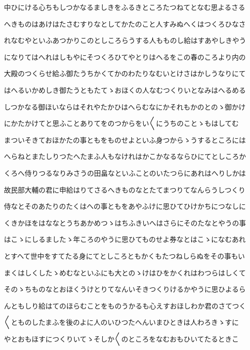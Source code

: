 \documentclass[a4paper,11pt,landscape]{ltjtarticle}
\begin{document}
\par\medskip
中ひにける心ちもしつかなるましきをふるきところたつねてとなむ思よるさる
\par\medskip
へきものはあけはたさむすりなとしてかたのこと人すみぬへくはつくろひなさ
\par\medskip
れなむやといふあつかりこのとしころらうする人もものし給はすあやしきやう
\par\medskip
になりてはへれはしもやにそつくろひてやとりはへるをこの春のころより内の
\par\medskip
大殿のつくらせ給ふ御たうちかくてかのわたりなむいとけさはかしうなりにて
\par\medskip
はへるいかめしき御たうともたてゝおほくの人なむつくりいとなみはへるめる
\par\medskip
しつかなる御ほいならはそれやたかひはへらむなにかそれもかのとのゝ御かけ
\par\medskip
にかたかけてと思ふことありてをのつからをい〱にうちのことゝもはしてむ
\par\medskip
まついそきておほかたの事ともをものせよといふ身つからゝうするところには
\par\medskip
へらねとまたしりつたへたまふ人もなけれはかこかなるならひにてとしころか
\par\medskip
くろへ侍りつるなりみさうの田畠なといふことのいたつらにあれはへりしかは
\par\medskip
故民部大輔の君に申給はりてさるへきものなとたてまつりてなんらうしつくり
\par\medskip
侍なとそのあたりのたくはへの事ともをあやふけに思ひてひけかちにつなしに
\par\medskip
くきかほをはななとうちあかめつゝはちふきいへはさらにそのたなとやうの事
\par\medskip
はこゝにしるましたゝ年ころのやうに思ひてものせよ券なとはこゝになむあれ
\par\medskip
とすへて世中をすてたる身にてとしころともかくもたつねしらぬをその事もい
\par\medskip
まくはしくしたゝめむなといふにも大とのゝけはひをかくれはわつらはしくて
\par\medskip
そのゝちものなとおほくうけとりてなんいそきつくりけるかやうに思ひよるら
\par\medskip
んともしり給はてのほらむことをものうかるも心えすおほしわか君のさてつく
\par\medskip
〱とものしたまふを後のよに人のいひつたへんいまひときは人わろきゝすに
\par\medskip
やとおもほすにつくりいてゝそしか〱のところをなむおもひいてたるときこ
\par\medskip
\end{document}
